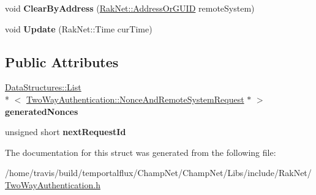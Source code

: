 \begin{DoxyCompactItemize}
\item 
\hypertarget{struct_rak_net_1_1_two_way_authentication_1_1_nonce_generator_aacea61bb3fa5790e10660a765730fc19}{void {\bfseries Clear\-By\-Address} (\hyperlink{struct_rak_net_1_1_address_or_g_u_i_d}{Rak\-Net\-::\-Address\-Or\-G\-U\-I\-D} remote\-System)}\label{struct_rak_net_1_1_two_way_authentication_1_1_nonce_generator_aacea61bb3fa5790e10660a765730fc19}

\item 
\hypertarget{struct_rak_net_1_1_two_way_authentication_1_1_nonce_generator_a9d02bfebf7da9b1066fc3e9d88c2f8d8}{void {\bfseries Update} (Rak\-Net\-::\-Time cur\-Time)}\label{struct_rak_net_1_1_two_way_authentication_1_1_nonce_generator_a9d02bfebf7da9b1066fc3e9d88c2f8d8}

\end{DoxyCompactItemize}
\subsection*{Public Attributes}
\begin{DoxyCompactItemize}
\item 
\hypertarget{struct_rak_net_1_1_two_way_authentication_1_1_nonce_generator_a552744e3228bfa48a81f00061f77db18}{\hyperlink{class_data_structures_1_1_list}{Data\-Structures\-::\-List}\\*
$<$ \hyperlink{struct_rak_net_1_1_two_way_authentication_1_1_nonce_and_remote_system_request}{Two\-Way\-Authentication\-::\-Nonce\-And\-Remote\-System\-Request} $\ast$ $>$ {\bfseries generated\-Nonces}}\label{struct_rak_net_1_1_two_way_authentication_1_1_nonce_generator_a552744e3228bfa48a81f00061f77db18}

\item 
\hypertarget{struct_rak_net_1_1_two_way_authentication_1_1_nonce_generator_a96f7a7672ced4773b4bf712dc80bfbbf}{unsigned short {\bfseries next\-Request\-Id}}\label{struct_rak_net_1_1_two_way_authentication_1_1_nonce_generator_a96f7a7672ced4773b4bf712dc80bfbbf}

\end{DoxyCompactItemize}


The documentation for this struct was generated from the following file\-:\begin{DoxyCompactItemize}
\item 
/home/travis/build/temportalflux/\-Champ\-Net/\-Champ\-Net/\-Libs/include/\-Rak\-Net/\hyperlink{_two_way_authentication_8h}{Two\-Way\-Authentication.\-h}\end{DoxyCompactItemize}
